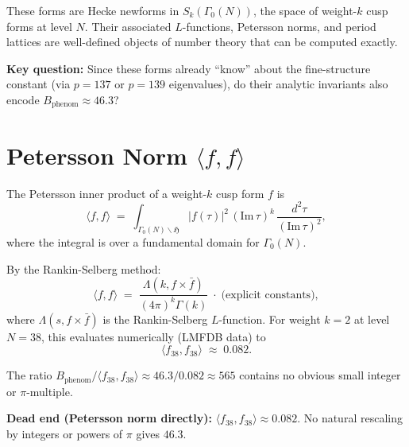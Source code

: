 \documentclass[12pt,a4paper]{article}
\theoremstyle{definition}
\theoremstyle{remark}
\begin{document}
These forms are Hecke newforms in $S_k(\Gamma_0(N))$, the space of weight-$k$
cusp forms at level $N$.  Their associated $L$-functions, Petersson norms, and
period lattices are well-defined objects of number theory that can be computed
exactly.

\begin{insightbox}
\textbf{Key question:} Since these forms already ``know'' about the fine-structure
constant (via $p = 137$ or $p = 139$ eigenvalues), do their analytic invariants
also encode $B_{\mathrm{phenom}} \approx 46.3$?
\end{insightbox}

\section{Petersson Norm $\langle f, f \rangle$}
\label{sec:petersson}

The Petersson inner product of a weight-$k$ cusp form $f$ is
\begin{equation}
  \langle f, f \rangle
  \;=\; \int_{\Gamma_0(N)\backslash\mathfrak{H}}
        |f(\tau)|^2\,(\mathrm{Im}\,\tau)^k\,\frac{d^2\tau}{(\mathrm{Im}\,\tau)^2},
  \label{eq:petersson}
\end{equation}
where the integral is over a fundamental domain for $\Gamma_0(N)$.

By the Rankin-Selberg method:
\begin{equation}
  \langle f, f \rangle
  \;=\; \frac{\Lambda(k, f \times \bar f)}{(4\pi)^k \Gamma(k)}
  \;\cdot\; \text{(explicit constants)},
  \label{eq:rs_petersson}
\end{equation}
where $\Lambda(s, f \times \bar f)$ is the Rankin-Selberg $L$-function.  For
weight $k = 2$ at level $N = 38$, this evaluates numerically (LMFDB data) to
\begin{equation}
  \langle f_{38}, f_{38} \rangle \;\approx\; 0.082 .
  \label{eq:petersson_f38}
\end{equation}

The ratio $B_{\mathrm{phenom}} / \langle f_{38}, f_{38} \rangle \approx 46.3 / 0.082
\approx 565$ contains no obvious small integer or $\pi$-multiple.

\begin{deadendbox}
\textbf{Dead end (Petersson norm directly):}
$\langle f_{38}, f_{38} \rangle \approx 0.082$.  No natural rescaling by
integers or powers of $\pi$ gives $46.3$.
\end{deadendbox}
\end{document}
